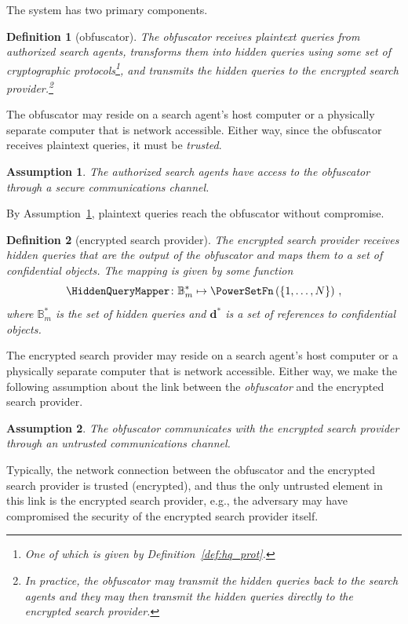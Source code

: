 \documentclass[final,11pt]{article}
\renewcommand{\vec}[1]{\boldsymbol{\mathbf{#1}}}
\newcommand{\cisb}{\mathbb{B}}
\numberwithin{equation}{section}
\theoremstyle{plain}
\newtheorem{definition}{Definition}[section]
\newtheorem{assumption}{Assumption}[section]
\theoremstyle{remark}
\begin{document}
The system has two primary components.
\begin{definition}[obfuscator]
The obfuscator receives plaintext queries from authorized search agents, transforms them into hidden queries using some set of cryptographic protocols\footnote{One of which is given by Definition~\ref{def:hq_prot}.}, and transmits the hidden queries to the encrypted search provider.\footnote{In practice, the obfuscator may transmit the hidden queries back to the search agents and they may then transmit the hidden queries directly to the encrypted search provider.}
\end{definition}
The obfuscator may reside on a search agent's host computer or a physically separate computer that is network accessible. Either way, since the obfuscator receives plaintext queries, it must be \emph{trusted}.
\begin{assumption}
\label{asm:obfuscator_secure}
The authorized search agents have access to the obfuscator through a \emph{secure communications channel}.
\end{assumption}
By Assumption~\ref{asm:obfuscator_secure}, plaintext queries reach the obfuscator without compromise.
\begin{definition}[encrypted search provider]
The encrypted search provider receives hidden queries that are the output of the obfuscator and maps them to a set of confidential objects. The mapping is given by some function
\begin{equation}
    \HiddenQueryMapper \colon \cisb_m^* \mapsto \PowerSetFn\left(\left\{1,\ldots,N\right\}\right)\,,
\end{equation}
where $\cisb_m^*$ is the set of hidden queries and $\vec{d}^*$ is a set of references to confidential objects.
\end{definition}

The encrypted search provider may reside on a search agent's host computer or a physically separate computer that is network accessible. Either way, we make the following assumption about the link between the \emph{obfuscator} and the encrypted search provider.
\begin{assumption}
\label{asm:untrusted_channel}
The obfuscator communicates with the encrypted search provider through an \emph{untrusted} communications channel.
\end{assumption}
Typically, the network connection between the obfuscator and the encrypted search provider is trusted (encrypted), and thus the only untrusted element in this link is the encrypted search provider, e.g., the adversary may have compromised the security of the encrypted search provider itself.
\end{document}
